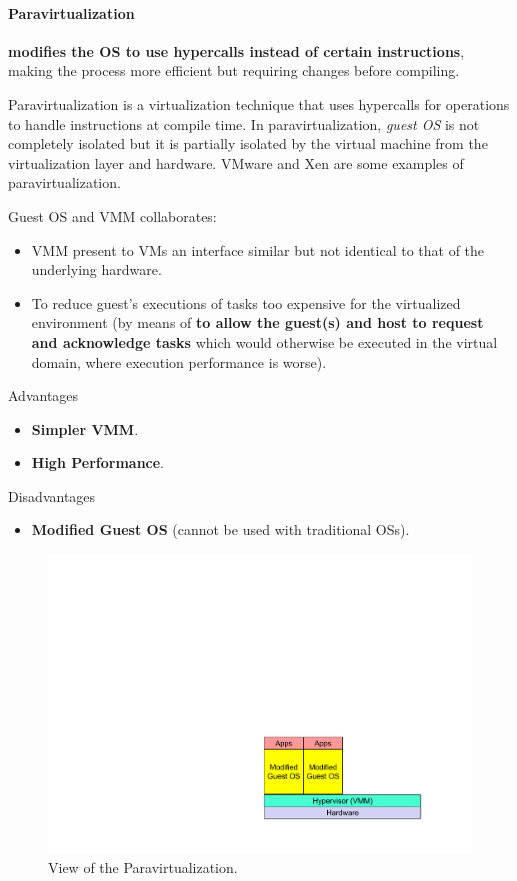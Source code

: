 \longline

\paragraph{Paravirtualization}

 \textbf{modifies the OS to use hypercalls instead of certain instructions}, making the process more efficient but requiring changes before compiling.

\highspace
Paravirtualization is a virtualization technique that uses hypercalls for operations to handle instructions at compile time. In paravirtualization, \emph{guest OS} is not completely isolated but it is partially isolated by the virtual machine from the virtualization layer and hardware. VMware and Xen are some examples of paravirtualization.

\highspace
Guest OS and VMM collaborates:
\begin{itemize}
	\item VMM present to VMs an interface similar but not identical to that of the underlying hardware.
	\item To reduce guest's executions of tasks too expensive for the virtualized environment (by means of \textbf{ to allow the guest(s) and host to request and acknowledge tasks} which would otherwise be executed in the virtual domain, where execution performance is worse).
\end{itemize}

\highspace
\begin{flushleft}
	\textcolor{Green3}{ Advantages}
\end{flushleft}
\begin{itemize}
	\item \textbf{Simpler VMM}.
	\item \textbf{High Performance}.
\end{itemize}

\begin{flushleft}
	\textcolor{Red2}{ Disadvantages}
\end{flushleft}
\begin{itemize}
	\item \textbf{Modified Guest OS} (cannot be used with traditional OSs).
\end{itemize}

\newpage

\begin{figure}[!htp]
	\centering
	\includegraphics[width=.6\textwidth]{img/paravirtualization-1.pdf}
	\caption{View of the Paravirtualization.}
\end{figure}

